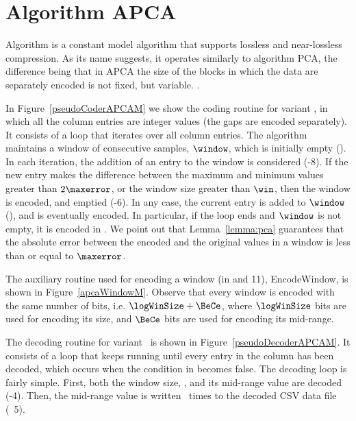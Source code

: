 
\clearpage

\section{Algorithm APCA}
\label{algo:apca}


Algorithm \textit{\APCAfull} \cite{coder:apca} is a constant model algorithm that supports lossless and near-lossless compression. As its name suggests, it operates similarly to algorithm PCA, the difference being that in APCA the size of the blocks in which the data are separately encoded is not fixed, but variable. \WindowParam {}.


In Figure~\ref{pseudoCoderAPCAM} we show the coding routine for variant \maskalgo, in which all the column entries are integer values (the gaps are encoded separately). It consists of a loop that iterates over all column entries. The algorithm maintains a window of consecutive samples, $\window$, which is initially empty (). In each iteration, the addition of an entry to the window is considered (-8). If the new entry makes the difference between the maximum and minimum values greater than $2\maxerror$, or the window size greater than $\win$, then the window is encoded, and emptied (-6). In any case, the current entry is added to $\window$ (), and is eventually encoded. In particular, if the loop ends and $\window$ is not empty, it is encoded in . We point out that Lemma~\ref{lemma:pca} guarantees that the absolute error between the encoded and the original values in a window is less than or equal to $\maxerror$.





\vspace{+2pt}
The auxiliary routine used for encoding a window (in  and 11), EncodeWindow, is shown in Figure~\ref{apcaWindowM}. Observe that every window is encoded with the same number of bits, i.e. $\logWinSize +\BeCe$, where $\logWinSize$ bits are used for encoding its size, and $\BeCe$ bits are used for encoding its mid-range.
\vspace{+3pt}





\clearpage


The decoding routine for variant \maskalgo\ is shown in Figure~\ref{pseudoDecoderAPCAM}. It consists of a loop that keeps running until every entry in the column has been decoded, which occurs when the condition in  becomes false. The decoding loop is fairly simple. First, both the window size, \sizee, and its mid-range value are decoded (-4). Then, the mid-range value is written \sizee\ times to the decoded CSV data file (\Line~5).


